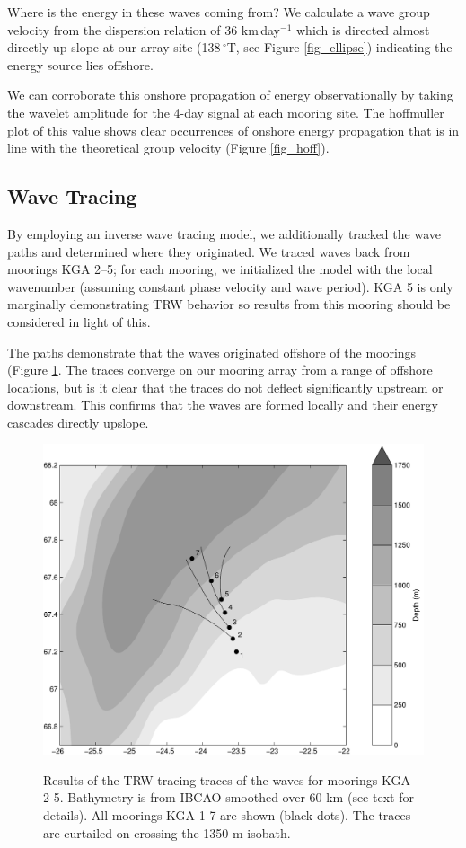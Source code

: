 \documentclass[12pt,titlepage,figuresatend]{article}
\begin{document}
Where is the energy in these waves coming from? We calculate a wave group velocity from the dispersion relation of 36 km$\,$day$^{-1}$ which is directed almost directly up-slope at our array site (138$\,^{\circ}$T, see Figure \ref{fig_ellipse}) indicating the energy source lies offshore.

We can corroborate this onshore propagation of energy observationally by taking the wavelet amplitude for the 4-day signal at each mooring site. The hoffmuller plot of this value shows clear occurrences of onshore energy propagation that is in line with the theoretical group velocity (Figure \ref{fig_hoff}).

\subsection{Wave Tracing}

By employing an inverse wave tracing model, we additionally tracked the wave paths and determined where they originated. We traced waves back from moorings KGA 2--5; for each mooring, we initialized the model with the local wavenumber (assuming constant phase velocity and wave period). KGA 5 is only marginally demonstrating TRW behavior so results from this mooring should be considered in light of this.

The paths demonstrate that the waves originated offshore of the moorings (Figure \ref{fig_waveTrace}. The traces converge on our mooring array from a range of offshore locations, but is it clear that the traces do not deflect significantly upstream or downstream. This confirms that the waves are formed locally and their energy cascades directly upslope.

\begin{figure}[p!]
  \centering\includegraphics[width=\hsize]{./figures/wave_trace.pdf}
  \caption{Results of the TRW tracing traces of the waves for moorings KGA 2-5. Bathymetry is from IBCAO smoothed over 60 km (see text for details). All moorings KGA 1-7 are shown (black dots). The traces are curtailed on crossing the 1350 m isobath.}{\label{fig_waveTrace}}
\end{figure}
\end{document}

